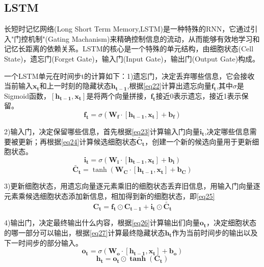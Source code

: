 \documentclass{article}
\begin{document}
\subsection{LSTM}
长短时记忆网络(Long Short Term Memory,LSTM)是一种特殊的RNN，它通过引入"门控机制"(Gating Machanism)来精确控制信息的流动，从而能够有效地学习和记忆长距离的依赖关系。LSTM的核心是一个特殊的单元结构，由细胞状态(Cell State)，遗忘门(Forget Gate)，输入门(Input Gate)，输出门(Output Gate)构成。

一个LSTM单元在时间步t的计算如下：1)遗忘门，决定丢弃哪些信息，它会接收当前输入$\boldsymbol{x_t}$和上一时刻的隐藏状态$\boldsymbol{h_{t-1}}$,根据\eqref{eq22}计算出遗忘向量$\boldsymbol{f_t}$,其中$\sigma$是Sigmoid函数，$\boldsymbol{[h_{t-1},x_t]}$是将两个向量拼接，$\boldsymbol{f_t}$接近0表示遗忘，接近1表示保留。
\begin{equation}
    \boldsymbol{f_t}=\sigma(\boldsymbol{W_f \cdot [h_{t-1},x_t]}+\boldsymbol{b_f}) \label{eq22}
\end{equation}

2)输入门，决定保留哪些信息，首先根据\eqref{eq23}计算输入门向量$\boldsymbol{i_t}$,决定哪些信息需要被更新；再根据\eqref{eq24}计算候选细胞状态$\boldsymbol{\tilde{C_t}}$，创建一个新的候选向量用于更新细胞状态。
\begin{equation}
    \boldsymbol{i_t}=\sigma(\boldsymbol{W_i \cdot [h_{t-1},x_t]}+\boldsymbol{b_i}) \label{eq23}
\end{equation}
\begin{equation}
    \boldsymbol{\tilde{C_t}}=\tanh(\boldsymbol{W_C \cdot [h_{t-1},x_t]}+\boldsymbol{b_C}) \label{eq24}
\end{equation}

3)更新细胞状态，用遗忘向量逐元素乘旧的细胞状态丢弃旧信息，用输入门向量逐元素乘候选细胞状态添加新信息，相加得到新的细胞状态，即\eqref{eq25}
\begin{equation}
    \boldsymbol{C_t}=\boldsymbol{f_t \odot C_{t-1}}+\boldsymbol{i_t \odot \boldsymbol{\tilde{C_t}}} \label{eq25}
\end{equation}

4)输出门，决定最终输出什么内容，根据\eqref{eq26}计算输出们向量$\boldsymbol{o_t}$，决定细胞状态的哪一部分可以输出，根据\eqref{eq27}计算最终隐藏状态$\boldsymbol{h_t}$作为当前时间步的输出以及下一时间步的部分输入。
\begin{equation}
    \boldsymbol{o_t}=\sigma(\boldsymbol{W_o \cdot [h_{t-1},x_t]}+\boldsymbol{b_o}) \label{eq26}
\end{equation}
\begin{equation}
    \boldsymbol{h_t}=\boldsymbol{o_t \odot \tanh(C_t)} \label{eq27}
\end{equation}
\end{document}
